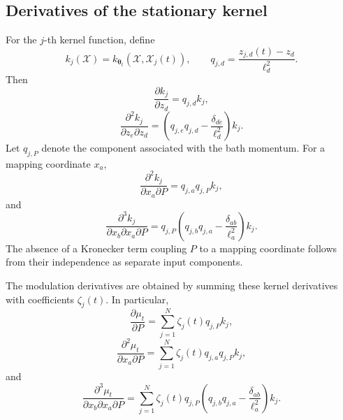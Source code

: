 \documentclass[
  11pt,
  letterpaper,
  onehalfspacing,
  normalmargins,
  equalmargins,
  oneside
]{ut-thesis}
\begin{document}
\subsection{Derivatives of the stationary kernel}
\label{subsec:kernel-derivative-identities-main}

For the \(j\)-th kernel function, define
\begin{equation}
 k_j(\boldsymbol{\mathcal X})
=
 k_{\boldsymbol\theta_t}
\left(
\boldsymbol{\mathcal X},
\boldsymbol{\mathcal X}_j(t)
\right),
\qquad
 q_{j,d}
=
\frac{z_{j,d}(t)-z_d}{\ell_d^2}.
\label{eq:gp-kernel-q-definition}
\end{equation}
Then
\begin{equation}
\frac{\partial k_j}{\partial z_d}
=
 q_{j,d}k_j,
\label{eq:gp-kernel-first-derivative}
\end{equation}
\begin{equation}
\frac{\partial^2 k_j}{\partial z_e\partial z_d}
=
\left(
 q_{j,e}q_{j,d}
-
\frac{\delta_{de}}{\ell_d^2}
\right)k_j.
\label{eq:gp-kernel-second-derivative}
\end{equation}
Let \(q_{j,P}\) denote the component associated with the bath momentum. For a
mapping coordinate \(x_a\),
\begin{equation}
\frac{\partial^2 k_j}{\partial x_a\partial P}
=
 q_{j,a}q_{j,P}k_j,
\label{eq:gp-kernel-mapping-P-derivative}
\end{equation}
and
\begin{equation}
\frac{\partial^3 k_j}
{\partial x_b\partial x_a\partial P}
=
 q_{j,P}
\left(
 q_{j,b}q_{j,a}
-
\frac{\delta_{ab}}{\ell_a^2}
\right)k_j.
\label{eq:gp-kernel-third-derivative}
\end{equation}
The absence of a Kronecker term coupling \(P\) to a mapping coordinate follows
from their independence as separate input components.

The modulation derivatives are obtained by summing these kernel derivatives
with coefficients \(\zeta_j(t)\). In particular,
\begin{equation}
\frac{\partial\mu_t}{\partial P}
=
\sum_{j=1}^{N}
\zeta_j(t)q_{j,P}k_j,
\label{eq:gp-modulation-P-derivative}
\end{equation}
\begin{equation}
\frac{\partial^2\mu_t}{\partial x_a\partial P}
=
\sum_{j=1}^{N}
\zeta_j(t)q_{j,a}q_{j,P}k_j,
\label{eq:gp-modulation-mapping-P-derivative}
\end{equation}
and
\begin{equation}
\frac{\partial^3\mu_t}
{\partial x_b\partial x_a\partial P}
=
\sum_{j=1}^{N}
\zeta_j(t)q_{j,P}
\left(
 q_{j,b}q_{j,a}
-
\frac{\delta_{ab}}{\ell_a^2}
\right)k_j.
\label{eq:gp-modulation-third-derivative}
\end{equation}
\end{document}
